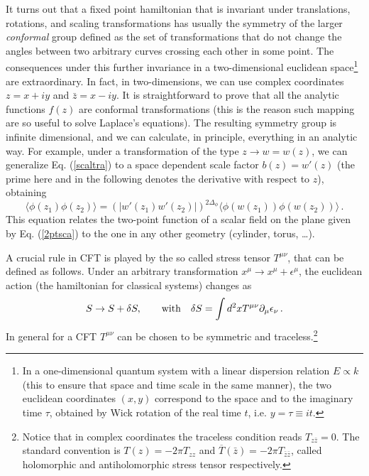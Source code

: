 \documentclass{ws-ijqi}
\def\be{\begin{equation}}
\def\ee{\end{equation}}
\begin{document}
It turns out that a fixed point hamiltonian that is invariant under
translations, rotations, and scaling transformations has usually the symmetry 
of the larger {\it conformal} group\cite{confbook} defined as the set of 
transformations that do not change the angles between two arbitrary curves 
crossing each other in some point.
The consequences under this further invariance in a two-dimensional 
euclidean space\footnote{In a one-dimensional quantum system with a linear
dispersion relation $E\propto k$ (this to ensure that space and time scale 
in the same manner), the two euclidean coordinates $(x,y)$ correspond to the 
space and to the imaginary time $\tau$, obtained by Wick rotation of the real
 time $t$, i.e. $y=\tau\equiv i t$.}
 are extraordinary. 
In fact, in two-dimensions, we can use complex coordinates $z=x+iy$ and
$\bar{z}=x-iy$.
It is straightforward to prove that all the analytic functions $f(z)$ 
are conformal transformations (this is the reason such mapping are so useful 
to solve Laplace's equations).
The resulting symmetry group is infinite dimensional, and we can calculate, 
in principle, everything in an analytic way. 
For example, under a transformation of the type $z\to w=w(z)$, 
we can generalize Eq. (\ref{scaltra}) to a space dependent 
scale factor $b(z)=w'(z)$ (the prime here and in the following denotes the
derivative with respect to $z$), obtaining
\be
\langle \phi(z_1) \phi(z_2) \rangle=
(|w'(z_1)w'(z_2)|)^{2 \Delta_\phi} 
\langle \phi(w(z_1)) \phi(w(z_2))\rangle\,.
\label{2pt}
\ee
This equation relates the two-point function of a scalar field
on the plane given by Eq. (\ref{2ptsca}) to 
the one in any other geometry (cylinder, torus, \dots).

A crucial rule in CFT is played by the so called stress tensor $T^{\mu\nu}$, 
that can be defined as follows. 
Under an arbitrary transformation $x^\mu\to x^\mu+\epsilon^\mu$,
the euclidean action (the hamiltonian for classical systems) changes as
\be
S\to S+\delta S, \qquad {\rm with }\quad \delta S=
\int d^2x T^{\mu\nu} \partial_\mu\epsilon_\nu\,.
\ee
In general for a CFT $T^{\mu\nu}$ can be chosen to be symmetric and 
traceless.\footnote{Notice that in complex coordinates the traceless condition
reads $T_{z\bar z}=0$. The standard convention is $T(z)=-2\pi T_{zz}$ and
$\overline{T}(\bar{z})=-2\pi T_{\bar{z}\bar{z}}$, called holomorphic 
and antiholomorphic stress tensor respectively.\cite{confbook}}
\end{document}
